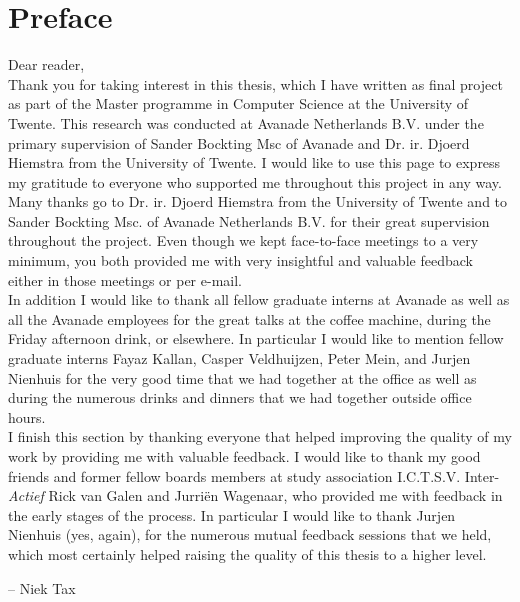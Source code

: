 
\bigskip

\begingroup
\let\clearpage\relax
\let\cleardoublepage\relax
\let\cleardoublepage\relax
\chapter*{Preface}
Dear reader,\\

Thank you for taking interest in this thesis, which I have written as final project as part of the Master programme in Computer Science at the University of Twente. This research was conducted at Avanade Netherlands B.V. under the primary supervision of Sander Bockting Msc of Avanade and Dr. ir. Djoerd Hiemstra from the University of Twente. I would like to use this page to express my gratitude to everyone who supported me throughout this project in any way.\\

Many thanks go to Dr. ir. Djoerd Hiemstra from the University of Twente and to Sander Bockting Msc. of Avanade Netherlands B.V. for their great supervision throughout the project. Even though we kept face-to-face meetings to a very minimum, you both provided me with very insightful and valuable feedback either in those meetings or per e-mail.\\

In addition I would like to thank all fellow graduate interns at Avanade as well as all the Avanade employees for the great talks at the coffee machine, during the Friday afternoon drink, or elsewhere. In particular I would like to mention fellow graduate interns Fayaz Kallan, Casper Veldhuijzen, Peter Mein, and Jurjen Nienhuis for the very good time that we had together at the office as well as during the numerous drinks and dinners that we had together outside office hours.\\

I finish this section by thanking everyone that helped improving the quality of my work by providing me with valuable feedback. I would like to thank my good friends and former fellow boards members at study association I.C.T.S.V. Inter-\emph{Actief} Rick van Galen and Jurri\"{e}n Wagenaar, who provided me with feedback in the early stages of the process. In particular I would like to thank Jurjen Nienhuis (yes, again), for the numerous mutual feedback sessions that we held, which most certainly helped raising the quality of this thesis to a higher level.\\
\bigskip

-- Niek Tax

\endgroup



